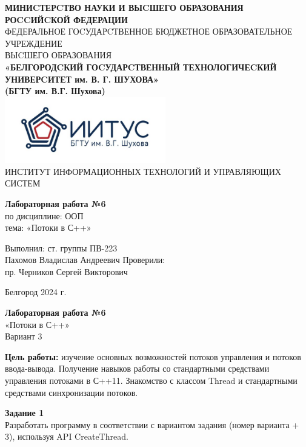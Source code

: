 \documentclass[a4paper,14pt]{extarticle}
\newcommand\textbox[1]{
	\parbox{.45\textwidth}{#1}
}
\begin{document}
\begin{center}
    \small{
        \textbf{МИНИCТЕРCТВО НАУКИ И ВЫCШЕГО ОБРАЗОВАНИЯ РОCCИЙCКОЙ ФЕДЕРАЦИИ}\\
        ФЕДЕРАЛЬНОЕ ГОCУДАРCТВЕННОЕ БЮДЖЕТНОЕ ОБРАЗОВАТЕЛЬНОЕ УЧРЕЖДЕНИЕ\\ВЫCШЕГО ОБРАЗОВАНИЯ \\
        \textbf{«БЕЛГОРОДCКИЙ ГОCУДАРCТВЕННЫЙ ТЕХНОЛОГИЧЕCКИЙ\\УНИВЕРCИТЕТ им. В. Г. ШУХОВА»\\ (БГТУ им. В.Г. Шухова)} \\
        \bigbreak
        \includegraphics[width=70mm]{log}\\
        ИНСТИТУТ ИНФОРМАЦИОННЫХ ТЕХНОЛОГИЙ И УПРАВЛЯЮЩИХ СИСТЕМ\\}
\end{center}

\vfill
\begin{center}
    \large{
        \textbf{
            Лабораторная работа №6}}\\
    \normalsize{
        по дисциплине: ООП \\
        тема: «Потоки в С++»}
\end{center}
\vfill
\hfill\textbox{
    Выполнил: ст. группы ПВ-223\\Пахомов Владислав Андреевич
    \bigbreak
    Проверили: \\пр. Черников Сергей Викторович
}
\vfill\begin{center}
    Белгород 2024 г.
\end{center}
\newpage
\begin{center}
    \textbf{Лабораторная работа №6}\\
    «Потоки в С++»\\
    Вариант 3
\end{center}
\textbf{Цель работы: }изучение основных возможностей потоков
управления и потоков ввода-вывода. Получение навыков работы со
стандартными средствами управления потоками в С++11. Знакомство с
классом Thread и стандартными средствами синхронизации потоков.

\textbf{Задание 1}\\
Разработать программу в соответствии с вариантом задания (номер
варианта + 3), используя API CreateThread.\\
\end{document}
